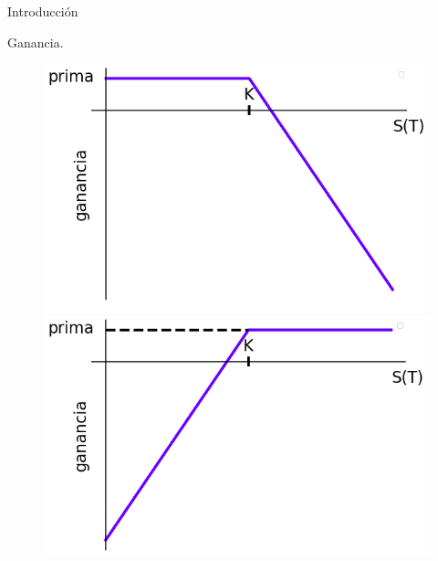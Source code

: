 \documentclass{beamer}
\begin{document}
\begin{frame}{Introducci\'on}
\begin{block}{Ganancia.}
    \begin{figure}[]
    \centering
    \begin{minipage}[b]{0.45\textwidth}
      \includegraphics[width=1\textwidth]{callshorty.png}  
    \end{minipage}
    \hfill
    \begin{minipage}[b]{0.45\textwidth}
      \includegraphics[width=1\textwidth]{putshorty.png}
    \end{minipage}
    \label{shortganancia}
    \end{figure}


  \end{block}

\end{frame}
\end{document}

